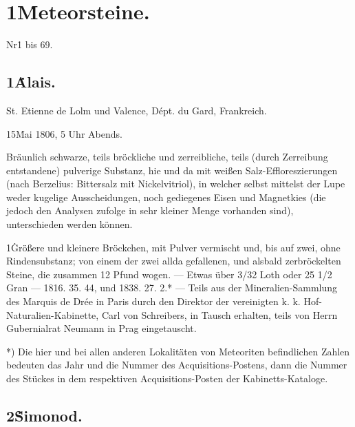 \documentclass[a4paper, 11pt, oneside, polutonikogreek, german]{article}
\begin{document}
\section{1\. Meteorsteine.}

Nr\. 1 bis 69.

\subsection{1\. Alais.}

St. Etienne de Lolm und Valence, Dépt. du Gard, Frankreich.

15\. Mai 1806, 5 Uhr Abends.

Bräunlich schwarze, teils bröckliche und zerreibliche, teils (durch Zerreibung entstandene) pulverige Substanz, hie und da mit weißen Salz-Effloreszierungen (nach Berzelius: Bittersalz mit Nickelvitriol), in welcher selbst mittelst der Lupe weder kugelige Ausscheidungen, noch gediegenes Eisen und Magnetkies (die jedoch den Analysen zufolge in sehr kleiner Menge vorhanden sind), unterschieden werden können.

1\. Größere und kleinere Bröckchen, mit Pulver vermischt und, bis auf zwei, ohne Rindensubstanz; von einem der zwei allda gefallenen, und alsbald zerbröckelten Steine, die zusammen 12 Pfund wogen. — Etwas über 3/32 Loth oder 25 1/2 Gran — 1816. 35. 44, und 1838. 27. 2.* — Teils aus der Mineralien-Sammlung des Marquis de Drée in Paris durch den Direktor der vereinigten k. k. Hof-Naturalien-Kabinette, Carl von Schreibers, in Tausch erhalten, teils von Herrn Gubernialrat Neumann in Prag eingetauscht.

*) Die hier und bei allen anderen Lokalitäten von Meteoriten befindlichen Zahlen bedeuten das Jahr und die Nummer des Acquisitions-Postens, dann die Nummer des Stückes in dem respektiven Acquisitions-Posten der Kabinetts-Kataloge.

\subsection{2\. Simonod.}

\clearpage
\end{document}
